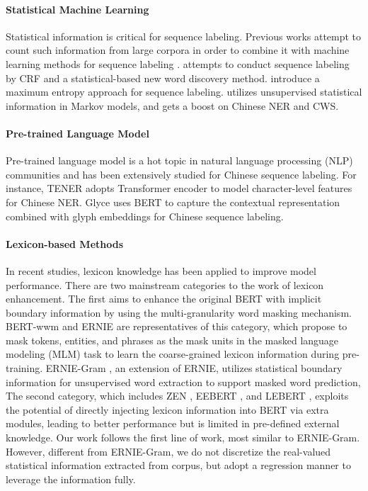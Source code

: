 \documentclass[11pt]{article}
\begin{document}
\begin{CJK}{UTF8}{gbsn}
\paragraph{Statistical Machine Learning}
Statistical information is critical for sequence labeling.
Previous works attempt to count such information from large corpora in order to combine it with machine learning methods for sequence labeling \cite{bellegarda2004statistical, liang2005semi, bouma2009normalized}.
\citet{peng2004chinese} attempts to conduct sequence labeling by CRF and a statistical-based new word discovery method.
\citet{low2005maximum} introduce a maximum entropy approach for sequence labeling.
\citet{liang2005semi} utilizes unsupervised statistical information in Markov models,
and gets a boost on Chinese NER and CWS.

\paragraph{Pre-trained Language Model}
Pre-trained language model is a hot topic in natural language processing (NLP) communities \cite{devlin2018bert, liu2019roberta, wei2019nezha, clark2020electra, diao-etal-2020-zen, zhang-etal-2021-ambert}
and has been extensively studied for Chinese sequence labeling.
For instance, TENER \cite{yan2019tener} adopts Transformer encoder to model character-level features for Chinese NER.
Glyce \cite{meng2019glyce} uses BERT to capture the contextual representation combined with glyph embeddings for Chinese sequence labeling.

\paragraph{Lexicon-based Methods}
In recent studies, lexicon knowledge has been applied to improve model performance.
There are two mainstream categories to the work of lexicon enhancement.
The first aims to enhance the original BERT with implicit boundary information by using the multi-granularity word masking mechanism.
BERT-wwm \cite{cui2021pre} and ERNIE \cite{sun2019ernie} are representatives of this category,
which propose to mask tokens, entities, and phrases as the mask units in the masked language modeling (MLM) task to learn the coarse-grained lexicon information during pre-training.
ERNIE-Gram \cite{xiao-etal-2021-ernie}, an extension of ERNIE, utilizes statistical boundary information for unsupervised word extraction to support masked word prediction,
The second category, which includes ZEN \cite{diao-etal-2020-zen}, EEBERT \cite{jia-etal-2020-entity}, and LEBERT \cite{liu-etal-2021-lexicon},
exploits the potential of directly injecting lexicon information into BERT via extra modules,
leading to better performance but is limited in pre-defined external knowledge.
Our work follows the first line of work, most similar to ERNIE-Gram.
However, different from ERNIE-Gram, we do not discretize the real-valued statistical information extracted from corpus, but adopt a regression manner to leverage the information fully.





\end{CJK}
\end{document}
